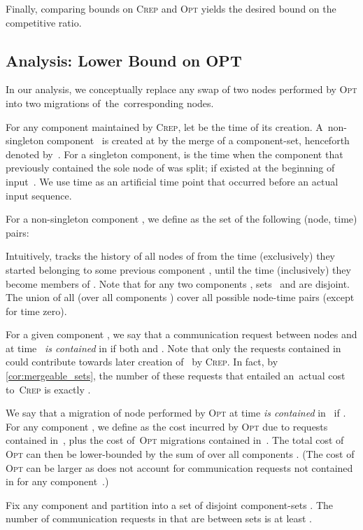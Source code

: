 \documentclass{siamart190516}
\newcommand{\OPT}{\textsc{Opt}\xspace}
\newcommand{\CREP}{\textsc{Crep}\xspace}
\begin{document}
Finally, comparing bounds on \CREP and \OPT yields the desired bound on the
competitive ratio.



\subsection{Analysis: Lower Bound on OPT}
\label{sec:opt_lower}

In our analysis, we conceptually
replace any swap of two nodes performed by \OPT into two migrations of~the~corresponding nodes.

For any component  maintained by \CREP, let  be the time of its
creation. A~non-singleton component~ is created at  by the merge
of a component-set, henceforth denoted by~. For a singleton component,
 is the time when the component that previously contained the sole
node of  was split;  if  existed at the beginning of
input~. We use time  as an artificial time point that occurred
before an actual input sequence.

For a non-singleton component , we 
define  as the set of the following (node, time) pairs:

Intuitively,  tracks the history of all nodes of  from the time 
(exclusively) they started belonging to some previous component , until the time 
(inclusively) they become members of . Note that for any two components 
, sets~ and  are disjoint.
The union of all  (over all components ) 
cover all possible node-time pairs (except for time zero). 

For a given component , we say that a communication request between nodes
 and  at time~ \emph{is contained} in  if both 
and . Note that only the requests contained in~
could contribute towards later creation of~ by \CREP. In fact, by
\cref{cor:mergeable_sets}, the number of these requests that
entailed an~actual cost to~\CREP is exactly .

We say that a migration of node  performed by \OPT at time  \emph{is
contained} in~ if . For any component , we define
 as the cost incurred by \OPT due to requests contained in~, 
plus the cost of~\OPT migrations contained in~. The total cost of \OPT
can then be lower-bounded by the sum of  over all components .
(The cost of \OPT can be larger as  does not account for 
communication requests not contained in  for any component~.)

\begin{lemma}
\label{lem:merge_action_cut}
Fix any component  and partition  into a set of  disjoint
component-sets . The number of communication requests
in  that are between sets  is at least .
\end{lemma}
\end{document}
